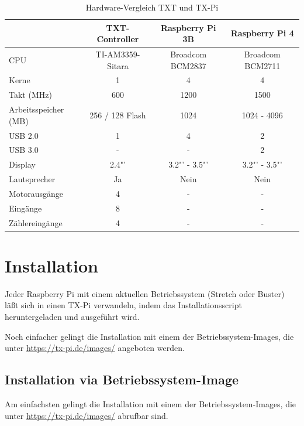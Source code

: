 \documentclass[
  paper=A4,
  ngerman,
  fontsize=12pt,
  parskip=half-,
]{scrbook}
\begin{document}
\begin{table}[ht]
\begin{tabular}{lccc}
                      & \textbf{TXT-Controller}   & \textbf{Raspberry Pi 3B}     & \textbf{Raspberry Pi 4} \\
\midrule
CPU                   & TI-AM3359-Sitara & Broadcom BCM2837    & Broadcom BCM2711 \\
Kerne                 & 1                & 4                   & 4 \\
Takt (MHz)            & 600              & 1200                & 1500 \\
Arbeitsspeicher (MB)  & 256 / 128 Flash  & 1024                & 1024 - 4096 \\
USB 2.0               & 1                & 4                   & 2 \\
USB 3.0               & -                & -                   & 2 \\
Display					 & 2.4"'              & 3.2"' - 3.5"'      & 3.2"' - 3.5"' \\
Lautsprecher          & Ja               & Nein                & Nein \\
Motorausgänge         & 4                & -                   & - \\
Eingänge              & 8                & -                   & - \\
Zählereingänge        & 4                & -                   & -
\end{tabular}
\caption{Hardware-Vergleich TXT und TX-Pi}
\label{tab:comparison}
\end{table}


\chapter{Installation}

Jeder Raspberry Pi mit einem aktuellen Betriebssystem (Stretch oder Buster) läßt 
sich in einen TX-Pi verwandeln, indem das Installationsscript heruntergeladen
und ausgeführt wird.

Noch einfacher gelingt die Installation mit einem der Betriebssystem-Images,
die unter \url{https://tx-pi.de/images/} angeboten werden.

\section{Installation via Betriebssystem-Image}
\label{sec:image}

Am einfachsten gelingt die Installation mit einem der Betriebssystem-Images,
die unter \url{https://tx-pi.de/images/} abrufbar sind.
\end{document}
